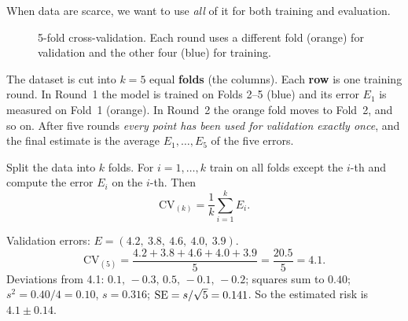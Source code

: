When data are scarce, we want to use \emph{all} of it for both training and evaluation.

\begin{figure}[!htbp]
\centering
{}
\caption{5-fold cross-validation. Each round uses a different fold (orange) for validation and the other four (blue) for training.}\label{fig:kfold}
\end{figure}

\begin{explain}
The dataset is cut into $k=5$ equal \textbf{folds} (the columns). Each \textbf{row} is one training round. In Round~1 the model is trained on Folds 2--5 (blue) and its error $E_1$ is measured on Fold~1 (orange). In Round~2 the orange fold moves to Fold~2, and so on. After five rounds \emph{every point has been used for validation exactly once}, and the final estimate is the average $E_1,\dots,E_5$ of the five errors.
\end{explain}

\begin{definition}
Split the data into $k$ folds. For $i=1,\dots,k$ train on all folds except the $i$-th and compute the error $E_i$ on the $i$-th. Then
\[
  \text{CV}_{(k)}=\frac1k\sum_{i=1}^{k}E_i .
\]
\end{definition}

\begin{example}
Validation errors: $E=(4.2,\ 3.8,\ 4.6,\ 4.0,\ 3.9)$.
\[
  \text{CV}_{(5)}=\frac{4.2+3.8+4.6+4.0+3.9}{5}=\frac{20.5}{5}=4.1 .
\]
Deviations from 4.1: $0.1,\,-0.3,\,0.5,\,-0.1,\,-0.2$; squares sum to $0.40$; $s^2=0.40/4=0.10$, $s=0.316$; $\operatorname{SE}=s/\sqrt5=0.141$. So the estimated risk is $4.1\pm0.14$.
\end{example}


